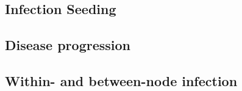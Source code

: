 \documentclass[11pt]{article}
\begin{document}
\subsection{Infection Seeding}

\subsection{Disease progression}

\subsection{Within- and between-node infection}
\end{document}
